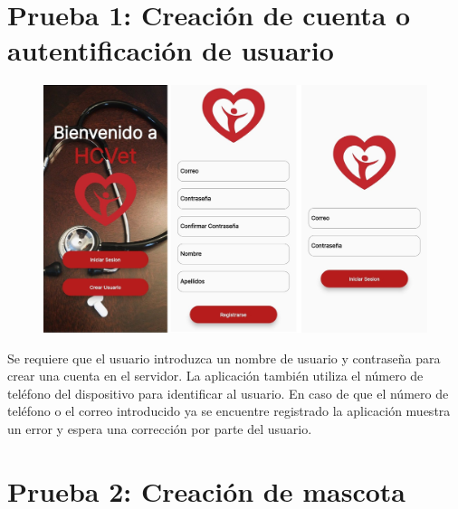 \newpage
\section{Prueba 1: Creación de cuenta o autentificación de usuario}

\begin{figure}[h!]
\begin{center}
\includegraphics[scale=0.25]{Graphics/images/hcvet/init.jpg}
\label{fig:bac}

\end{center}
\end{figure}

Se requiere que el usuario introduzca un nombre de usuario y contraseña para crear una cuenta en el servidor. La aplicación también utiliza el número de teléfono del dispositivo para identificar al usuario. En caso de que el número de teléfono o el correo introducido ya se encuentre registrado la aplicación muestra un error y espera una corrección por parte del usuario.

\newpage
 
\section{Prueba 2: Creación de mascota}

